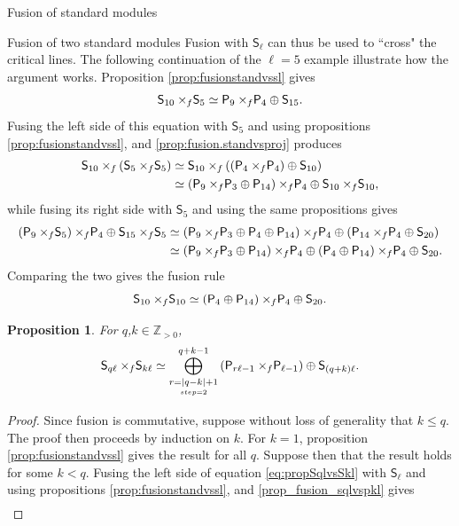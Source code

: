 \documentclass[reqno]{amsart}
\newtheorem{Prop}[Thm]{Proposition}
\newcommand{\ds}[1]{\mathsf S_{#1}}
\newcommand{\dP}[1]{\mathsf P_{#1}}
\newcommand{\xf}{\times\hspace{-0.27em}_f}
\newcommand{\lc}{\ell}
\begin{document}
\begin{section}{Fusion of standard modules}
\begin{subsection}{Fusion of two standard modules}
Fusion with $\ds{\lc}$ can thus be used to ``cross" the critical lines. The following continuation of the $\lc=5$ example illustrate how the argument works. Proposition \ref{prop:fusionstandvssl} gives
\begin{equation}
\ds{10} \xf \ds{5} \simeq \dP{9} \xf \dP{4} \oplus \ds{15}\text{.}
\end{equation}
Fusing the left side of this equation with $\ds{5}$ and using propositions \ref{prop:fusionstandvssl}, and \ref{prop:fusion.standvsproj} produces
\begin{align}
	\ds{10} \xf \left(\ds{5} \xf \ds{5}\right) &\simeq \ds{10} \xf \left(\left(\dP{4} \xf \dP{4}\right)  \oplus \ds{10} \right) \notag\\
	& \simeq \left(\dP{9} \xf \dP{3} \oplus \dP{14}\right) \xf \dP{4} \oplus \ds{10}\xf \ds{10},
\end{align}
while fusing its right side with $\ds{5}$ and using the same propositions gives
\begin{align}
	\left(\dP{9}\xf \ds{5} \right) \xf \dP{4} \oplus \ds{15}\xf \ds{5} &\simeq \left( \dP{9} \xf \dP{3}
\oplus \dP{4} \oplus \dP{14} \right) \xf \dP{4} \oplus \left(\dP{14} \xf \dP{4} \oplus \ds{20} \right) \notag\\
	& \simeq \left(  \dP{9} \xf \dP{3} \oplus \dP{14}\right) \xf \dP{4} \oplus \left(\dP{4} \oplus \dP{14} \right) \xf \dP{4} \oplus \ds{20}.
\end{align}
Comparing the two gives the fusion rule $$\ds{10} \xf \ds{10} \simeq (\dP{4} \oplus \dP{14})\xf \dP{4} \oplus \ds{20}.$$ 
\begin{Prop}\label{prop:fusionSqlvsSkl}
For $q$,$k \in \mathbb{Z}_{>0}$,
\begin{equation}\label{eq:propSqlvsSkl}
\ds{q \lc} \xf \ds{ k \lc} \simeq \overset{q+k-1}{\underset{\underset{step =2}{r = |q-k|+1}}{\bigoplus}}\left(\dP{r \lc -1} \xf \dP{\lc -1} \right) \oplus \ds{(q+k)\lc}\text{.}
\end{equation}
\end{Prop}
\begin{proof}
Since fusion is commutative, suppose without loss of generality that $k \leq q$. The proof then proceeds by induction on $k$. For $k=1$, proposition \ref{prop:fusionstandvssl} gives the result for all $q$. Suppose then that the result holds for some $k < q$. Fusing the left side of equation \eqref{eq:propSqlvsSkl} with $\ds{\lc}$ and using propositions \ref{prop:fusionstandvssl}, and \ref{prop_fusion_sqlvspkl} gives
\begin{align}

\end{align}
\end{proof}
\end{subsection}
\end{section}
\end{document}
